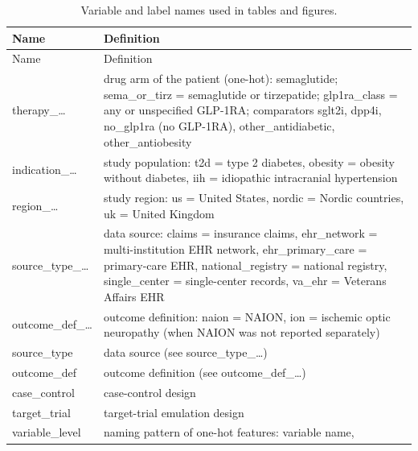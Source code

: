 \documentclass[journal]{IEEEtran}
\begin{document}
{\footnotesize
\begin{longtable}[]{@{}
  >{\raggedright\arraybackslash}p{}
  >{\raggedright\arraybackslash}p{}@{}}
\caption{Variable and label names used in tables and
figures.}\tabularnewline
\toprule\noalign{}
\begin{minipage}[b]{\linewidth}\raggedright
Name
\end{minipage} & \begin{minipage}[b]{\linewidth}\raggedright
Definition
\end{minipage} \\
\midrule\noalign{}
\endfirsthead
\toprule\noalign{}
\begin{minipage}[b]{\linewidth}\raggedright
Name
\end{minipage} & \begin{minipage}[b]{\linewidth}\raggedright
Definition
\end{minipage} \\
\midrule\noalign{}
\endhead
\bottomrule\noalign{}
\endlastfoot
therapy\_\ldots{} & drug arm of the patient (one-hot): semaglutide;
sema\_or\_tirz = semaglutide or tirzepatide; glp1ra\_class = any or
unspecified GLP-1RA; comparators sglt2i, dpp4i, no\_glp1ra (no GLP-1RA),
other\_antidiabetic, other\_antiobesity \\
indication\_\ldots{} & study population: t2d = type 2 diabetes, obesity
= obesity without diabetes, iih = idiopathic intracranial
hypertension \\
region\_\ldots{} & study region: us = United States, nordic = Nordic
countries, uk = United Kingdom \\
source\_type\_\ldots{} & data source: claims = insurance claims,
ehr\_network = multi-institution EHR network, ehr\_primary\_care =
primary-care EHR, national\_registry = national registry, single\_center
= single-center records, va\_ehr = Veterans Affairs EHR \\
outcome\_def\_\ldots{} & outcome definition: naion = NAION, ion =
ischemic optic neuropathy (when NAION was not reported separately) \\
source\_type & data source (see source\_type\_\ldots) \\
outcome\_def & outcome definition (see outcome\_def\_\ldots) \\
case\_control & case-control design \\
target\_trial & target-trial emulation design \\
variable\_level & naming pattern of one-hot features: variable name,

\end{longtable}}
\end{document}
